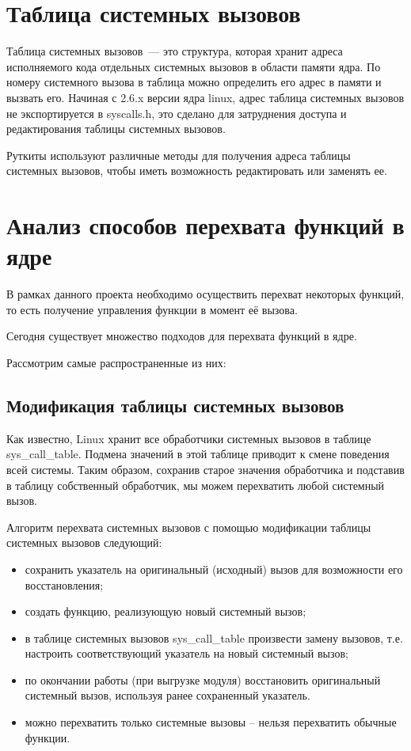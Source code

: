 \section{Таблица системных вызовов}%
\label{sec:tablitsa_sistemnykh_vyzovov}

Таблица системных вызовов~--- это структура, которая хранит адреса исполняемого кода отдельных системных вызовов в области памяти ядра. По номеру системного вызова в таблица можно определить его адрес в памяти и вызвать его. Начиная с 2.6.x версии ядра linux, адрес таблица системных вызовов не экспортируется в syscalls.h, это сделано для затруднения доступа и редактирования таблицы системных вызовов.

Руткиты используют различные методы для получения адреса таблицы системных вызовов, чтобы иметь возможность редактировать или заменять ее.

\section{Анализ способов перехвата функций в ядре}%
\label{sec:analiz_sposobov_perekhvata_funktsii_v_iadre}

В рамках данного проекта необходимо осуществить перехват некоторых функций, то есть получение управления функции в момент её вызова.

Сегодня существует множество подходов для перехвата функций в ядре. 

Рассмотрим самые распространенные из них:

\subsection{Модификация таблицы системных вызовов}%
\label{sub:modifikatsiia_tablitsy_sistemnykh_vyzovov}

Как известно, Linux хранит все обработчики системных вызовов в таблице sys\_call\_table. Подмена значений в этой таблице приводит к смене поведения всей системы. Таким образом, сохранив старое значения обработчика и подставив в таблицу собственный обработчик, мы можем перехватить любой системный вызов.

Алгоритм перехвата системных вызовов с помощью модификации таблицы системных вызовов следующий:
\begin{itemize}
    \item
        сохранить указатель на оригинальный (исходный) вызов для возможности его восстановления;
    \item
    создать функцию, реализующую новый системный вызов;
    \item
    в таблице системных вызовов sys\_call\_table произвести замену вызовов, т.е. настроить соответствующий указатель на новый системный вызов;
    \item
    по окончании работы (при выгрузке модуля) восстановить оригинальный системный вызов, используя ранее сохраненный указатель.
    \item 
    можно перехватить только системные вызовы – нельзя перехватить
	обычные функции.
\end{itemize}

